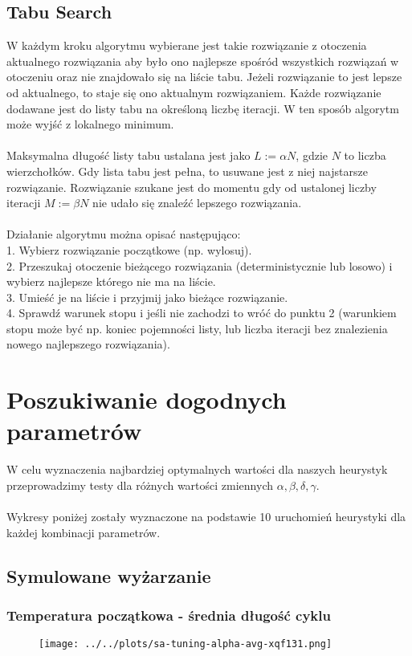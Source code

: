 \documentclass{article}
\begin{document}
\subsection*{Tabu Search}
W każdym kroku algorytmu wybierane jest takie rozwiązanie z otoczenia aktualnego rozwiązania
aby było ono najlepsze spośród wszystkich rozwiązań w otoczeniu oraz nie znajdowało się na liście tabu. Jeżeli rozwiązanie to jest lepsze od aktualnego, to staje się ono aktualnym rozwiązaniem.
Każde rozwiązanie dodawane jest do listy tabu na określoną liczbę iteracji. W ten sposób algorytm może wyjść z lokalnego minimum.\\\\
Maksymalna długość listy tabu ustalana jest jako $L := \alpha N$, gdzie $N$ to liczba wierzchołków. Gdy lista tabu jest pełna, to usuwane jest z niej najstarsze rozwiązanie.
Rozwiązanie szukane jest do momentu gdy od ustalonej liczby iteracji $M := \beta N$ nie udało się znaleźć lepszego rozwiązania.\\\\
Działanie algorytmu można opisać następująco:\\
1. Wybierz rozwiązanie początkowe (np. wylosuj).\\
2. Przeszukaj otoczenie bieżącego rozwiązania (deterministycznie lub losowo) i wybierz najlepsze którego nie ma na liście.\\
3. Umieść je na liście i przyjmij jako bieżące rozwiązanie.\\
4. Sprawdź warunek stopu i jeśli nie zachodzi to wróć do punktu 2 (warunkiem stopu może być np. koniec pojemności listy, lub liczba iteracji bez znalezienia nowego najlepszego rozwiązania).\\
\section*{Poszukiwanie dogodnych parametrów}
W celu wyznaczenia najbardziej optymalnych wartości dla naszych heurystyk przeprowadzimy testy dla różnych wartości zmiennych $\alpha, \beta, \delta, \gamma$.\\\\
Wykresy poniżej zostały wyznaczone na podstawie 10 uruchomień heurystyki dla każdej kombinacji parametrów.
\subsection*{Symulowane wyżarzanie}
\subsubsection*{Temperatura początkowa - średnia długość cyklu}
    \begin{figure}[h!]
        \centering
        \texttt{[image: ../../plots/sa-tuning-alpha-avg-xqf131.png]}
    \end{figure}
\end{document}
